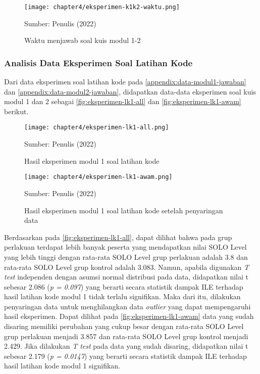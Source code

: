\begin{figure}[H]
  \centering
  \texttt{[image: chapter4/eksperimen-k1k2-waktu.png]}
  \caption{Waktu menjawab soal kuis modul 1-2} \label{fig:eksperimen-k1k2-waktu}
  Sumber: Penulis (2022)
\end{figure}

\subsubsection{Analisis Data Eksperimen Soal Latihan Kode}

Dari data eksperimen soal latihan kode pada \autoref{appendix:data-modul1-jawaban} dan \autoref{appendix:data-modul2-jawaban}, didapatkan data-data eksperimen soal kuis modul 1 dan 2 sebagai \autoref{fig:eksperimen-lk1-all} dan \autoref{fig:eksperimen-lk1-awam} berikut.

\begin{figure}[H]
  \centering
  \texttt{[image: chapter4/eksperimen-lk1-all.png]}
  \caption{Hasil eksperimen modul 1 soal latihan kode} \label{fig:eksperimen-lk1-all}
  Sumber: Penulis (2022)
\end{figure}
\begin{figure}[H]
  \centering
  \texttt{[image: chapter4/eksperimen-lk1-awam.png]}
  \caption{Hasil eksperimen modul 1 soal latihan kode setelah penyaringan data} \label{fig:eksperimen-lk1-awam}
  Sumber: Penulis (2022)
\end{figure}

Berdasarkan pada \autoref{fig:eksperimen-lk1-all}, dapat dilihat bahwa pada grup perlakuan terdapat lebih banyak peserta yang mendapatkan nilai SOLO Level yang lebih tinggi dengan rata-rata SOLO Level grup perlakuan adalah 3.8 dan rata-rata SOLO Level grup kontrol adalah 3.083. Namun, apabila digunakan \textit{T test} independen dengan asumsi normal distribusi pada data, didapatkan nilai t sebesar 2.086 (\textit{p = 0.097}) yang berarti secara statistik dampak ILE terhadap hasil latihan kode modul 1 tidak terlalu signifikan. Maka dari itu, dilakukan penyaringan data untuk menghilangkan data \textit{outlier} yang dapat mempengaruhi hasil eksperimen. Dapat dilihat pada \autoref{fig:eksperimen-lk1-awam} data yang sudah disaring memiliki perubahan yang cukup besar dengan rata-rata SOLO Level grup perlakuan menjadi 3.857 dan rata-rata SOLO Level grup kontrol menjadi 2.429. Jika dilakukan \textit{T test} pada data yang sudah disaring, didapatkan nilai t sebesar 2.179 (\textit{p = 0.0147}) yang berarti secara statistik dampak ILE terhadap hasil latihan kode modul 1 signifikan.

